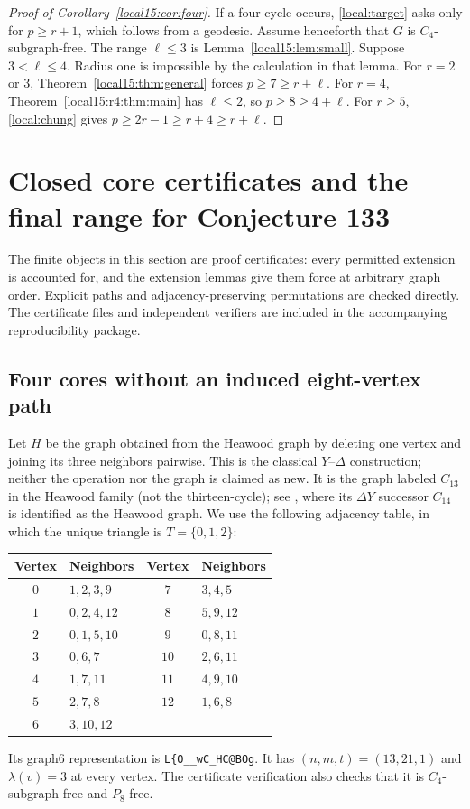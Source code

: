 \documentclass[11pt,a4paper]{article}
\theoremstyle{definition}\newtheorem{definition}[theorem]{Definition}
\theoremstyle{remark}\newtheorem{remark}[theorem]{Remark}
\begin{document}
\begin{proof}[Proof of Corollary~\ref{local15:cor:four}]
If a four-cycle occurs, \eqref{local:target} asks only for $p\ge r+1$, which
follows from a geodesic. Assume henceforth that $G$ is $C_4$-subgraph-free.
The range $\ell\le3$ is Lemma~\ref{local15:lem:small}. Suppose $3<\ell\le4$.
Radius one is impossible by the calculation in that lemma. For $r=2$
or $3$, Theorem~\ref{local15:thm:general} forces $p\ge7\ge r+\ell$.
For $r=4$, Theorem~\ref{local15:r4:thm:main} has $\ell\le2$,
so $p\ge8\ge4+\ell$. For $r\ge5$, \eqref{local:chung} gives
$p\ge2r-1\ge r+4\ge r+\ell$.
\end{proof}



\section{Closed core certificates and the final range for Conjecture 133}
\label{sec:local-certificates}
The finite objects in this section are proof certificates: every permitted
extension is accounted for, and the extension lemmas give them force at
arbitrary graph order. Explicit paths and adjacency-preserving permutations
are checked directly. The certificate files and independent verifiers are
included in the accompanying reproducibility package.
\subsection{Four cores without an induced eight-vertex path}


Let $H$ be the graph obtained from the Heawood graph by deleting one
vertex and joining its three neighbors pairwise. This is the classical
$Y$--$\Delta$ construction; neither the operation nor the graph is
claimed as new. It is the graph labeled $C_{13}$ in the Heawood family
(not the thirteen-cycle); see \cite[Figure 1.3]{src:heawoodfamily}, where its
$\Delta Y$ successor $C_{14}$ is identified as the Heawood graph.
We use the following adjacency table, in which the
unique triangle is $T=\{0,1,2\}$:
\begin{center}
\begin{tabular}{cl@{\qquad}cl}
\toprule
Vertex&Neighbors&Vertex&Neighbors\\\midrule
$0$&$1,2,3,9$&$7$&$3,4,5$\\
$1$&$0,2,4,12$&$8$&$5,9,12$\\
$2$&$0,1,5,10$&$9$&$0,8,11$\\
$3$&$0,6,7$&$10$&$2,6,11$\\
$4$&$1,7,11$&$11$&$4,9,10$\\
$5$&$2,7,8$&$12$&$1,6,8$\\
$6$&$3,10,12$&&\\\bottomrule
\end{tabular}
\end{center}
Its graph6 representation is \texttt{L\{O\_\_wC\_HC@BOg}.
It has $(n,m,t)=(13,21,1)$ and $\lambda(v)=3$ at every vertex.
The certificate verification also checks that it is $C_4$-subgraph-free
and $P_8$-free.
\end{document}
